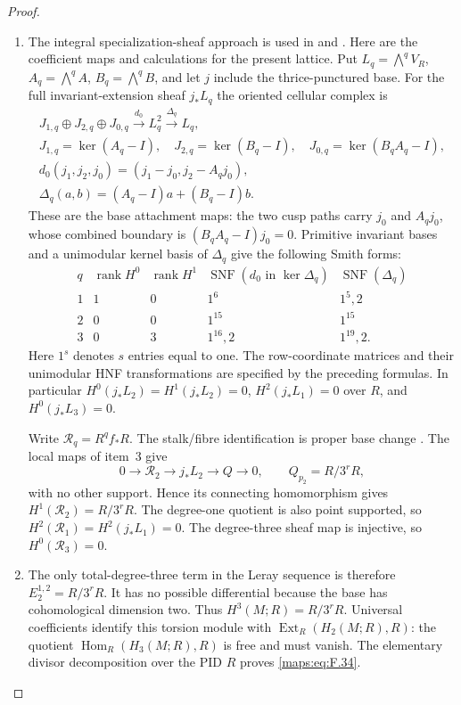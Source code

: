 \begin{proof}
\begin{enumerate}[label={$\langle1\rangle$\arabic*.}]
\item The integral specialization-sheaf approach is used in
\cite[Lemma 7.25 and Propositions 7.26--7.27, pp.~61--63]{AC26}
and \cite[section ``The integral homology'']{E26}.
Here are the coefficient maps and calculations for the present lattice.  Put $L_q=\bigwedge^qV_R$, $A_q=\bigwedge^qA$,
$B_q=\bigwedge^qB$, and let $j$ include the thrice-punctured base.
For the full invariant-extension sheaf $j_*L_q$ the oriented
cellular complex is
\[
\begin{gathered}
 J_{1,q}\oplus J_{2,q}\oplus J_{0,q}
 \xrightarrow{d_0}L_q^2\xrightarrow{\Delta_q}L_q,\\
 J_{1,q}=\ker(A_q-I),\quad J_{2,q}=\ker(B_q-I),\quad
 J_{0,q}=\ker(B_qA_q-I),\\
 d_0(j_1,j_2,j_0)=(j_1-j_0,j_2-A_qj_0),\\
 \Delta_q(a,b)=(A_q-I)a+(B_q-I)b.
\end{gathered}
\]
These are the base attachment maps: the two cusp paths
carry $j_0$ and $A_qj_0$, whose combined boundary is
$(B_qA_q-I)j_0=0$.  Primitive invariant bases and a unimodular
kernel basis of $\Delta_q$ give the following Smith forms:
\[
\begin{array}{c|c|c|c|c}
q&\operatorname{rank}H^0&\operatorname{rank}H^1&
 \operatorname{SNF}(d_0\text{ in }\ker\Delta_q)&
 \operatorname{SNF}(\Delta_q)\\\hline
1&1&0&1^6&1^5,2\\
2&0&0&1^{15}&1^{15}\\
3&0&3&1^{16},2&1^{19},2.
\end{array}
\]
Here $1^s$ denotes $s$ entries equal to one.  The row-coordinate
matrices and their unimodular HNF transformations are specified by the preceding formulas.
In particular $H^0(j_*L_2)=H^1(j_*L_2)=0$,
$H^2(j_*L_1)=0$ over $R$, and $H^0(j_*L_3)=0$.

Write $\mathcal R_q=R^qf_*R$.  The stalk/fibre
identification is proper base change
\cite[Tag 09V5, Lemma 20.18.1]{StacksProject}.
The local maps of item~3 give
\[
 0\longrightarrow\mathcal R_2\longrightarrow j_*L_2
 \longrightarrow Q\longrightarrow0,
 \qquad Q_{p_2}=R/3^rR,
\]
with no other support.  Hence its connecting homomorphism gives
$H^1(\mathcal R_2)=R/3^rR$.
The degree-one quotient is also point supported, so
$H^2(\mathcal R_1)=H^2(j_*L_1)=0$.
The degree-three sheaf map is injective, so
$H^0(\mathcal R_3)=0$.

\item The only total-degree-three term in the Leray sequence
\cite[Tag 01F2, Lemma 20.13.4]{StacksProject} is therefore
$E_2^{1,2}=R/3^rR$.  It has no possible differential because
the base has cohomological dimension two.  Thus
$H^3(M;R)=R/3^rR$.
Universal coefficients
\cite[Theorem 3.2, p.~195]{Hatcher2002} identify this torsion
module with $\operatorname{Ext}_R(H_2(M;R),R)$: the quotient
$\operatorname{Hom}_R(H_3(M;R),R)$ is free and must vanish.
The elementary divisor decomposition over the PID $R$ proves
\eqref{maps:eq:F.34}.


\end{enumerate}
\end{proof}
